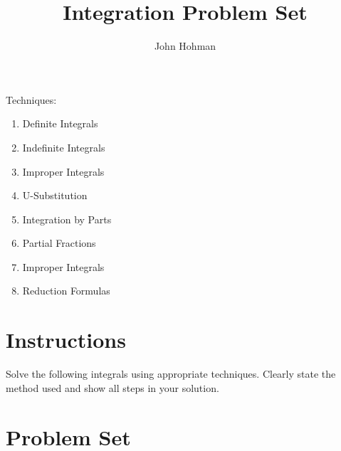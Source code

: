 \documentclass[12pt]{extarticle}
\begin{document}
 
%
%
 
\title{Integration Problem Set}
\author{John Hohman}
\date{}
\maketitle

Techniques: 
\begin{enumerate}
\item Definite Integrals
\item Indefinite Integrals
\item Improper Integrals
\item U-Substitution
\item Integration by Parts
\item Partial Fractions
\item Improper Integrals
\item Reduction Formulas
\end{enumerate}

\section*{Instructions}
Solve the following integrals using appropriate techniques. Clearly state the method used and show all steps in your solution.

\section*{Problem Set}
\end{document}
